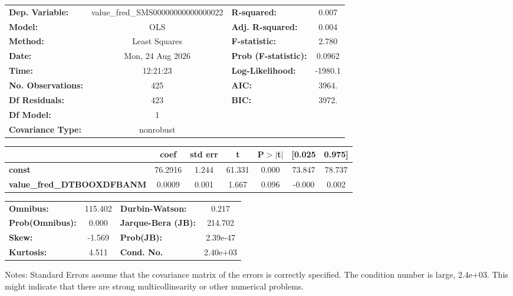 \begin{center}
\begin{tabular}{lclc}
\toprule
\textbf{Dep. Variable:}            & value\_fred\_SMS00000000000000022 & \textbf{  R-squared:         } &     0.007   \\
\textbf{Model:}                    &                OLS                & \textbf{  Adj. R-squared:    } &     0.004   \\
\textbf{Method:}                   &           Least Squares           & \textbf{  F-statistic:       } &     2.780   \\
\textbf{Date:}                     &          Mon, 24 Aug 2026         & \textbf{  Prob (F-statistic):} &   0.0962    \\
\textbf{Time:}                     &              12:21:23             & \textbf{  Log-Likelihood:    } &   -1980.1   \\
\textbf{No. Observations:}         &                  425              & \textbf{  AIC:               } &     3964.   \\
\textbf{Df Residuals:}             &                  423              & \textbf{  BIC:               } &     3972.   \\
\textbf{Df Model:}                 &                    1              & \textbf{                     } &             \\
\textbf{Covariance Type:}          &             nonrobust             & \textbf{                     } &             \\
\bottomrule
\end{tabular}
\begin{tabular}{lcccccc}
                                   & \textbf{coef} & \textbf{std err} & \textbf{t} & \textbf{P$> |$t$|$} & \textbf{[0.025} & \textbf{0.975]}  \\
\midrule
\textbf{const}                     &      76.2916  &        1.244     &    61.331  &         0.000        &       73.847    &       78.737     \\
\textbf{value\_fred\_DTBOOXDFBANM} &       0.0009  &        0.001     &     1.667  &         0.096        &       -0.000    &        0.002     \\
\bottomrule
\end{tabular}
\begin{tabular}{lclc}
\textbf{Omnibus:}       & 115.402 & \textbf{  Durbin-Watson:     } &    0.217  \\
\textbf{Prob(Omnibus):} &   0.000 & \textbf{  Jarque-Bera (JB):  } &  214.702  \\
\textbf{Skew:}          &  -1.569 & \textbf{  Prob(JB):          } & 2.39e-47  \\
\textbf{Kurtosis:}      &   4.511 & \textbf{  Cond. No.          } & 2.40e+03  \\
\bottomrule
\end{tabular}
\end{center}

Notes: \newline
 [1] Standard Errors assume that the covariance matrix of the errors is correctly specified. \newline
 [2] The condition number is large, 2.4e+03. This might indicate that there are \newline
 strong multicollinearity or other numerical problems.